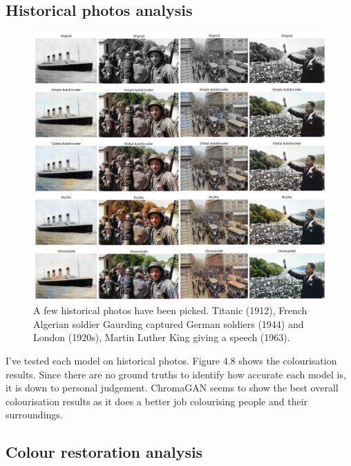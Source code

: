 \pagebreak
\subsection{Historical photos analysis}
\begin{figure}[H]
    \centering
    \includegraphics[width=1\columnwidth]{sections/figures/historical_colourised_photos.png}
    \caption{A few historical photos have been picked. Titanic (1912),  French Algerian soldier Gaurding captured German soldiers (1944) and London (1920s), Martin Luther King giving a speech (1963).}
    \label{fig:my_label}
\end{figure}
I've tested each model on historical photos. Figure 4.8 shows the colourisation results. Since there are no ground truths to identify how accurate each model is, it is down to personal judgement. ChromaGAN seems to show the best overall colourisation results as it does a better job colourising people and their surroundings. 

\subsection{Colour restoration analysis}

